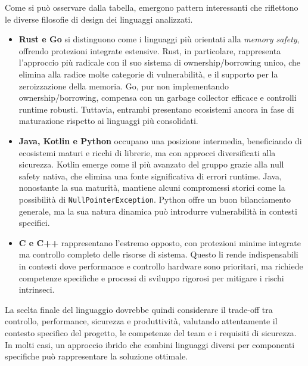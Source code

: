 
\bigskip
\noindent

Come si può osservare dalla tabella, emergono pattern interessanti che riflettono
le diverse filosofie di design dei linguaggi analizzati.

\begin{itemize}
  \item \textbf{Rust e Go} si distinguono come i linguaggi più orientati alla
    \textit{memory safety}, offrendo protezioni integrate estensive. Rust, in
    particolare, rappresenta l'approccio più radicale con il suo sistema di ownership/borrowing
    unico, che elimina alla radice molte categorie di vulnerabilità, e il supporto
    per la zeroizzazione della memoria. Go, pur non implementando ownership/borrowing,
    compensa con un garbage collector efficace e controlli runtime robusti. Tuttavia,
    entrambi presentano ecosistemi ancora in fase di maturazione rispetto ai
    linguaggi più consolidati.

  \item \textbf{Java, Kotlin e Python} occupano una posizione intermedia, beneficiando
    di ecosistemi maturi e ricchi di librerie, ma con approcci diversificati
    alla sicurezza. Kotlin emerge come il più avanzato del gruppo grazie alla null
    safety nativa, che elimina una fonte significativa di errori runtime. Java,
    nonostante la sua maturità, mantiene alcuni compromessi storici come la possibilità
    di \texttt{NullPointerException}. Python offre un buon bilanciamento generale,
    ma la sua natura dinamica può introdurre vulnerabilità in contesti specifici.

  \item \textbf{C e C++} rappresentano l'estremo opposto, con protezioni minime integrate
    ma controllo completo delle risorse di sistema. Questo li rende
    indispensabili in contesti dove performance e controllo hardware sono
    prioritari, ma richiede competenze specifiche e processi di sviluppo rigorosi
    per mitigare i rischi intrinseci.
\end{itemize}

La scelta finale del linguaggio dovrebbe quindi considerare il trade-off tra
controllo, performance, sicurezza e produttività, valutando attentamente il contesto
specifico del progetto, le competenze del team e i requisiti di sicurezza. In molti
casi, un approccio ibrido che combini linguaggi diversi per componenti
specifiche può rappresentare la soluzione ottimale.